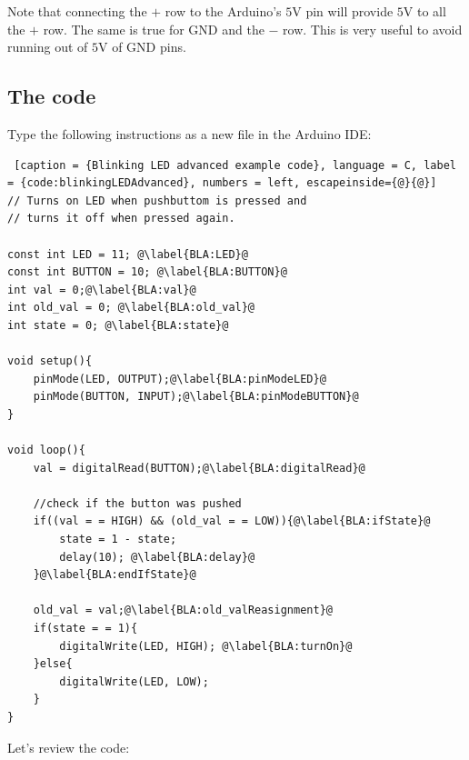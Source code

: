 Note that connecting the $+$ row to the Arduino's $5$V pin will provide $5$V to all the $+$ row. The same is true for GND and the $-$ row. This is very useful to avoid running out of $5$V of GND pins.


\subsection{The code} \label{code:blinkingLEDAdvanced}

Type the following instructions as a new file in the Arduino IDE:

\begin{lstlisting} [caption = {Blinking LED advanced example code}, language = C, label = {code:blinkingLEDAdvanced}, numbers = left, escapeinside={@}{@}]
// Turns on LED when pushbuttom is pressed and
// turns it off when pressed again.

const int LED = 11; @\label{BLA:LED}@
const int BUTTON = 10; @\label{BLA:BUTTON}@
int val = 0;@\label{BLA:val}@
int old_val = 0; @\label{BLA:old_val}@
int state = 0; @\label{BLA:state}@

void setup(){
	pinMode(LED, OUTPUT);@\label{BLA:pinModeLED}@
	pinMode(BUTTON, INPUT);@\label{BLA:pinModeBUTTON}@
}

void loop(){
	val = digitalRead(BUTTON);@\label{BLA:digitalRead}@
	
	//check if the button was pushed
	if((val = = HIGH) && (old_val = = LOW)){@\label{BLA:ifState}@
		state = 1 - state;
		delay(10); @\label{BLA:delay}@
	}@\label{BLA:endIfState}@
	
	old_val = val;@\label{BLA:old_valReasignment}@
	if(state = = 1){
		digitalWrite(LED, HIGH); @\label{BLA:turnOn}@
	}else{
		digitalWrite(LED, LOW);
	}
}
\end{lstlisting}

Let's review the code:

